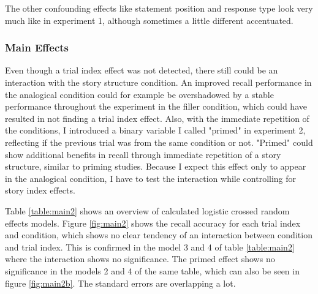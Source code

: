 \documentclass[a4paper,man,natbib,floatsintext,import]{apa6}
\begin{document}
The other confounding effects like statement position and response type look very much like in experiment 1, although sometimes a little different accentuated.

\subsubsection{Main Effects}



Even though a trial index effect was not detected, there still could be an interaction with the story structure condition. An improved recall performance in the analogical condition could for example be overshadowed by a stable performance throughout the experiment in the filler condition, which could have resulted in not finding a trial index effect. Also, with the immediate repetition of the conditions, I introduced a binary variable I called "primed" in experiment 2, reflecting if the previous trial was from the same condition or not. "Primed" could show additional benefits in recall through immediate repetition of a story structure, similar to priming studies. Because I expect this effect only to appear in the analogical condition, I have to test the interaction while controlling for story index effects.

Table \ref{table:main2} shows an overview of calculated logistic crossed random effects models. Figure \ref{fig:main2} shows the recall accuracy for each trial index and condition, which shows no clear tendency of an interaction between condition and trial index. This is confirmed in the model 3 and 4 of table \ref{table:main2} where the interaction shows no significance. The primed effect shows no significance in the models 2 and 4 of the same table, which can also be seen in figure \ref{fig:main2b}. The standard errors are overlapping a lot.
\end{document}

